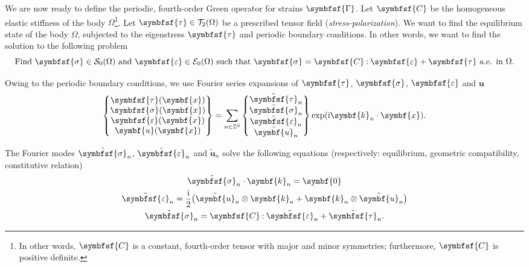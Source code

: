 \documentclass[draft, appendixprefix=true, chapterprefix=true, fontsize=12pt, numbers=noendperiod]{scrbook}
\newcommand{\dbldot}{\mathbin{\mathord{:}}}
\newcommand{\I}{\mathrm{i}}
\newcommand{\integers}{\mathbb{Z}}
\newcommand{\tens}[1]{\symbfsf{#1}}
\renewcommand{\vec}[1]{\symbf{#1}}
\newcommand{\tensors}{\mathcal T}
\newcommand{\stresses}{\mathcal S}
\newcommand{\strains}{\mathcal E}
\begin{document}
We are now ready to define the periodic, fourth-order Green operator for
strains \(\tens\Gamma\). Let \(\tens C\) be the homogeneous elastic stiffness
of the body \(\Omega\)\footnote{In other words, \(\tens C\) is a constant,
  fourth-order tensor with major and minor symmetries; furthermore, \(\tens C\)
  is positive definite.}. Let \(\tens\tau\in\tensors_2(\Omega)\) be a
prescribed tensor field (\emph{stress-polarization}). We want to find the
equilibrium state of the body \(\Omega\), subjected to the eigenstress
\(\tens\tau\) and periodic boundary conditions. In other words, we want to find
the solution to the following problem
\begin{equation}
  \label{eq:6}
  \text{Find }\tens\sigma\in\stresses_0(\Omega)
  \text{ and }\tens\varepsilon\in\strains_0(\Omega)
  \text{ such that }\tens\sigma=\tens C\dbldot\tens\varepsilon+\tens\tau
  \text{ a.e. in }\Omega.
\end{equation}

Owing to the periodic boundary conditions, we use Fourier series expansions of
\(\tens\tau\), \(\tens\sigma\), \(\tens\varepsilon\) and \(\vec u\)
\begin{equation}
  \label{eq:10}
  \begin{Bmatrix}
    \tens\tau(\vec x)\\
    \tens\sigma(\vec x)\\
    \tens\varepsilon(\vec x)\\
    \vec u(\vec x)
  \end{Bmatrix}
  =\sum_{n\in\integers^d}
  \begin{Bmatrix}
    \tilde{\tens\tau}_n\\
    \tilde{\tens\sigma}_n\\
    \tilde{\tens\varepsilon}_n\\
    \tilde{\vec u}_n
  \end{Bmatrix}
  \exp(\I \vec k_n\cdot\vec x).
\end{equation}

The Fourier modes \(\tilde{\tens\sigma}_n\), \(\tilde{\tens\varepsilon}_n\) and
\(\tilde{\vec u}_n\) solve the following equations (respectively: equilibrium,
geometric compatibility, constitutive relation)
\begin{subequations}
  \label{eq:11}
  \begin{gather}
    \label{eq:15}
    \tilde{\tens\sigma}_n\cdot\vec k_n=\vec 0\\
    \label{eq:13}
    \tilde{\tens\varepsilon}_n=\frac{\I}{2}\bigl(\tilde{\vec u}_n\otimes\vec k_n
    +\vec k_n\otimes\tilde{\vec u}_n\bigr)\\
    \label{eq:12}
    \tilde{\tens\sigma}_n=\tens C\dbldot\tilde{\tens\varepsilon}_n
    +\tilde{\tens\tau}_n.
  \end{gather}
\end{subequations}
\end{document}

